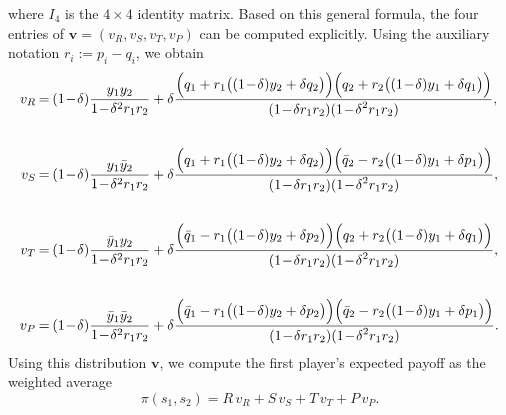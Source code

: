 \documentclass[11pt]{article}
\def\strategy{s}
\theoremstyle{plainCl1}
\theoremstyle{plainCl2}
\begin{document}
where $I_4$ is the $4\times4$ identity matrix. 
Based on this general formula, the four entries of $\mathbf{v}=(v_R, v_S, v_T, v_P)$ can be computed explicitly. 
Using the auxiliary notation $r_i:=p_i\!-\!q_i$, we obtain
    \begin{equation} \label{Eq:vAverage}
      \setlength{\arraycolsep}{1pt}
      \begin{array}{rcl}    
      v_{R} &= &\displaystyle (1\!-\!\delta)\frac{y_1y_2}{1\!-\!\delta^2 r_1 r_2}+\delta \frac{\Big(q_1+r_1\big((1\!-\!\delta)y_2+\delta q_2\big)\Big) \Big(q_2+r_2\big((1\!-\!\delta)y_1+\delta q_1\big)\Big)}
      {\displaystyle(1\!-\!\delta r_1r_2)(1\!-\!\delta^2 r_1 r_2)},\\[1cm]
      v_{S}&= &\displaystyle (1\!-\!\delta)\frac{y_1\bar{y}_2}{1\!-\!\delta^2 r_1 r_2}+\delta \frac{\Big(q_1+r_1\big((1\!-\!\delta)y_2+\delta q_2\big)\Big) \Big(\bar{q}_2-r_2\big((1\!-\!\delta)y_1+\delta p_1\big)\Big)}
      {\displaystyle(1\!-\!\delta r_1r_2)(1\!-\!\delta^2 r_1 r_2)},\\[1cm]
      v_{T} &= &\displaystyle (1\!-\!\delta)\frac{\bar{y}_1y_2}{1\!-\!\delta^2 r_1 r_2}+\delta \frac{\Big(\bar{q}_1-r_1\big((1\!-\!\delta)y_2+\delta p_2\big)\Big) \Big(q_2+r_2\big((1\!-\!\delta)y_1+\delta q_1\big)\Big)}
      {\displaystyle(1\!-\!\delta r_1r_2)(1\!-\!\delta^2 r_1 r_2)},\\[1cm]
      v_{P} &= &\displaystyle (1\!-\!\delta)\frac{\bar{y}_1\bar{y}_2}{1\!-\!\delta^2 r_1 r_2}+\delta \frac{\Big(\bar{q}_1-r_1\big((1\!-\!\delta)y_2+\delta p_2\big)\Big) \Big(\bar{q}_2-r_2\big((1\!-\!\delta)y_1+\delta p_1\big)\Big)}
      {\displaystyle(1\!-\!\delta r_1r_2)(1\!-\!\delta^2 r_1 r_2)}.
      \end{array}
    \end{equation}
Using this distribution $\mathbf{v}$, we compute the first player's expected payoff as the weighted average
\begin{equation}\label{eq:expected_payoff}
\pi(\strategy_1,\strategy_2) = R \, v_R + S\,v_S + T\,v_T + P\,v_P. 
\end{equation}

\end{document}
